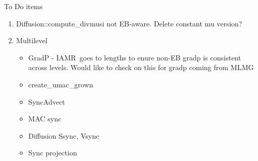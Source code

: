 \documentclass[11pt]{report}
\newcommand{\iamr}{{\sf IAMR}}
\begin{document}
To Do items
\begin{enumerate}
\item
  Diffusion::compute\_divmusi not EB-aware. Delete constant mu version?
\item
  Multilevel
  \begin{itemize}
  \item
    GradP - \iamr\ goes to lengths to enure non-EB gradp is consistent across levels. Would like to check on this for gradp coming from MLMG
  \item
    create\_umac\_grown
  \item
    SyncAdvect
  \item
    MAC sync
  \item
    Diffusion Ssync, Vsync 
  \item
    Sync projection
  \end{itemize}
\end{enumerate}
\end{document}
